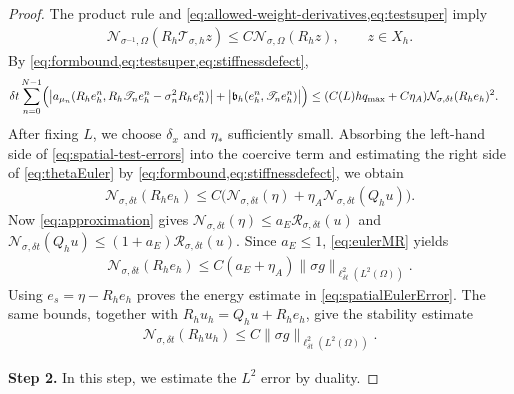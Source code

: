 \documentclass[print,wide,eng]{draft}
\begin{document}
\begin{proof}
The product rule and \cref{eq:allowed-weight-derivatives,eq:testsuper} imply
%
\begin{align*}
\mathcal N_{\sigma^{-1},\Omega}(R_h\mathscr{T}_{\sigma,h}z)
\leq C\mathcal N_{\sigma,\Omega}(R_hz),\qquad z\in X_h.
\end{align*}
%
By \cref{eq:formbound,eq:testsuper,eq:stiffnessdefect},
%
\begin{align}\label{eq:spatial-test-errors}
&{\delta t}\sum_{n=0}^{N-1}\Bigl(
\bigl|a_{\mu_n}(R_he_h^n,R_h\mathscr{T}_ne_h^n-\sigma_n^2R_he_h^n)\bigr|
+\bigl|\mathfrak b_h(e_h^n,\mathscr{T}_ne_h^n)\bigr|\Bigr)
\leq (C(L)hq_{\max}+C\eta_A)\mathcal N_{\sigma,{\delta t}}(R_he_h)^2.
\end{align}
%
After fixing $L$, we choose $\delta_x$ and $\eta_*$ sufficiently small. Absorbing the left-hand side of \cref{eq:spatial-test-errors} into the coercive term and estimating the right side of \cref{eq:thetaEuler} by \cref{eq:formbound,eq:stiffnessdefect}, we obtain
%
\begin{align*}
\mathcal N_{\sigma,{\delta t}}(R_he_h)
\leq C\bigl(\mathcal N_{\sigma,{\delta t}}(\eta)+\eta_A\mathcal N_{\sigma,{\delta t}}(Q_hu)\bigr).
\end{align*}
%
Now \cref{eq:approximation} gives $\mathcal N_{\sigma,{\delta t}}(\eta)\leq a_E\mathcal R_{\sigma,{\delta t}}(u)$ and $\mathcal N_{\sigma,{\delta t}}(Q_hu)\leq(1+a_E)\mathcal R_{\sigma,{\delta t}}(u)$. Since $a_E\leq1$, \cref{eq:eulerMR} yields
%
\begin{align}\label{eq:spatial-energy-stability}
\mathcal N_{\sigma,{\delta t}}(R_he_h)
\leq C(a_E+\eta_A)\|\sigma g\|_{\ell_{\delta t}^2(L^2(\Omega))}.
\end{align}
%
Using $e_s=\eta-R_he_h$ proves the energy estimate in \cref{eq:spatialEulerError}.
The same bounds, together with $R_hu_h=Q_hu+R_he_h$, give the stability estimate
%
\begin{align}\label{eq:spatial-state-stability}
\mathcal N_{\sigma,{\delta t}}(R_hu_h)
\leq C\|\sigma g\|_{\ell_{\delta t}^2(L^2(\Omega))}.
\end{align}
%

{\bf Step 2.} In this step, we estimate the $L^2$ error by duality.


\end{proof}
\end{document}
